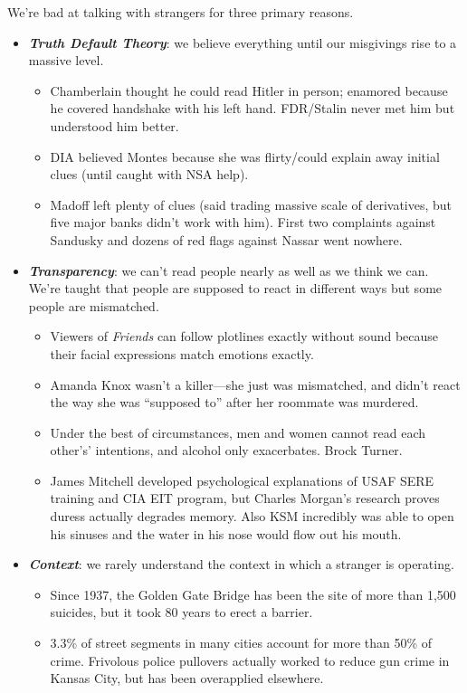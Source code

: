 \documentclass[
]{article}
\begin{document}
We're bad at talking with strangers for three primary reasons.

\begin{itemize}
\item
  \textbf{\emph{Truth Default Theory}}: we believe everything until our
  misgivings rise to a massive level.

  \begin{itemize}
  \item
    Chamberlain thought he could read Hitler in person; enamored because
    he covered handshake with his left hand. FDR/Stalin never met him
    but understood him better.
  \item
    DIA believed Montes because she was flirty/could explain away
    initial clues (until caught with NSA help).
  \item
    Madoff left plenty of clues (said trading massive scale of
    derivatives, but five major banks didn't work with him). First two
    complaints against Sandusky and dozens of red flags against Nassar
    went nowhere.
  \end{itemize}
\item
  \textbf{\emph{Transparency}}: we can't read people nearly as well as
  we think we can. We're taught that people are supposed to react in
  different ways but some people are mismatched.

  \begin{itemize}
  \item
    Viewers of \emph{Friends} can follow plotlines exactly without sound
    because their facial expressions match emotions exactly.
  \item
    Amanda Knox wasn't a killer---she just was mismatched, and didn't
    react the way she was ``supposed to'' after her roommate was
    murdered.
  \item
    Under the best of circumstances, men and women cannot read each
    other's' intentions, and alcohol only exacerbates. Brock Turner.
  \item
    James Mitchell developed psychological explanations of USAF SERE
    training and CIA EIT program, but Charles Morgan's research proves
    duress actually degrades memory. Also KSM incredibly was able to
    open his sinuses and the water in his nose would flow out his mouth.
  \end{itemize}
\item
  \textbf{\emph{Context}}: we rarely understand the context in which a
  stranger is operating.

  \begin{itemize}
  \item
    Since 1937, the Golden Gate Bridge has been the site of more than
    1,500 suicides, but it took 80 years to erect a barrier.
  \item
    3.3\% of street segments in many cities account for more than 50\%
    of crime. Frivolous police pullovers actually worked to reduce gun
    crime in Kansas City, but has been overapplied elsewhere.
  \end{itemize}
\end{itemize}
\end{document}
